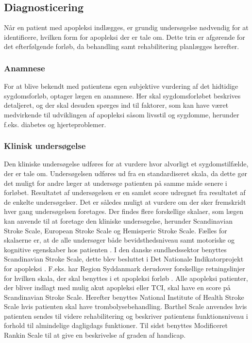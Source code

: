 \subsection{Diagnosticering}

Når en patient med apopleksi indlægges, er grundig undersøgelse nødvendig for at identificere, hvilken form for apopleksi der er tale om. Dette trin er afgørende for det efterfølgende forløb, da behandling samt rehabilitering planlægges herefter. \cite{Sundhedsstyrelsen2009}

\subsubsection{Anamnese}
For at blive bekendt med patientens egen subjektive vurdering af det hidtidige sygdomsforløb, optager lægen en anamnese. Her skal sygdomsforløbet  beskrives detaljeret, og der skal desuden spørges ind til faktorer, som kan have været medvirkende til udviklingen af apopleksi såsom livsstil og sygdomme, herunder f.eks. diabetes og hjerteproblemer. \cite{Sundhedsstyrelsen2009}

\subsubsection{Klinisk undersøgelse}
Den kliniske undersøgelse udføres for at vurdere hvor alvorligt et sygdomstilfælde, der er tale om. Undersøgelsen udføres ud fra en standardiseret skala, da dette gør det muligt for andre læger at undersøge patienten på samme måde senere i forløbet. Resultatet af undersøgelsen er en samlet score udregnet fra resultatet af de enkelte undersøgelser. Det er således muligt at vurdere om der sker fremskridt hver gang undersøgelsen foretages. \cite{Sundhedsstyrelsen2009}
Der findes flere forskellige skalaer, som lægen kan anvende til at foretage den kliniske undersøgelse, herunder Scandinavian Stroke Scale, European Stroke Scale og Hemisperic Stroke Scale. Fælles for skalaerne er, at de alle undersøger både bevidsthedsniveau samt motoriske og kognitive egenskaber hos patienten \cite{Center, Centera, Centerb, Centerc}. I den danske sundhedssektor benyttes Scandinavian Stroke Scale, dette blev besluttet i Det Nationale Indikatorprojekt for apopleksi \cite{Apopleksi2009}. F.eks. har Region Syddanmark derudover forskellige retningslinjer for hvilken skala, der skal benyttes i et apopleksi forløb \cite{Syddanmark}. Alle apopleksi patienter, der bliver indlagt med mulig akut apopleksi eller TCI, skal have en score på Scandinavian Stroke Scale. Herefter benyttes National Institute of Health Stroke Scale hvis patienten skal have trombolysebehandling. Barthel Scale anvendes hvis patienten sendes til videre rehabilitering og beskriver patientens funktionsniveau i forhold til almindelige dagligdags funktioner. Til sidst benyttes Modificeret Rankin Scale til at give en beskrivelse af graden af handicap. \cite{Syddanmark}

